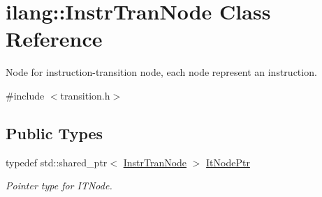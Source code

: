 \hypertarget{classilang_1_1_instr_tran_node}{}\section{ilang\+:\+:Instr\+Tran\+Node Class Reference}
\label{classilang_1_1_instr_tran_node}


Node for instruction-\/transition node, each node represent an instruction.  




{\ttfamily \#include $<$transition.\+h$>$}

\subsection*{Public Types}
\begin{DoxyCompactItemize}
\item 
\mbox{\label{classilang_1_1_instr_tran_node_a449144ce50eff60a35867b970f4608c6}} 
typedef std\+::shared\+\_\+ptr$<$ \mbox{\hyperlink{classilang_1_1_instr_tran_node}{Instr\+Tran\+Node}} $>$ \mbox{\hyperlink{classilang_1_1_instr_tran_node_a449144ce50eff60a35867b970f4608c6}{It\+Node\+Ptr}}
\begin{DoxyCompactList}\small\item\em Pointer type for I\+T\+Node. \end{DoxyCompactList}\end{DoxyCompactItemize}
